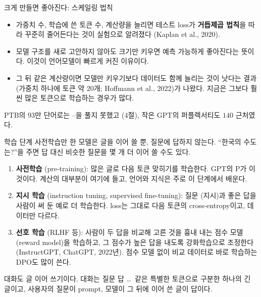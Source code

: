 \documentclass[aspectratio=169,11pt]{beamer}
\begin{document}
\begin{frame}{크게 만들면 좋아진다: 스케일링 법칙}
\begin{itemize}
\item 가중치 수, 학습에 쓴 토큰 수, 계산량을 늘리면 테스트 loss가 \textbf{거듭제곱 법칙}을 따라
  꾸준히 줄어든다는 것이 실험으로 알려졌다 (Kaplan et al., 2020).
\item 모델 구조를 새로 고안하지 않아도 크기만 키우면 예측 가능하게 좋아진다는 뜻이다.
  이것이 언어모델이 빠르게 커진 이유이다.
\item 그 뒤 같은 계산량이면 모델만 키우기보다 데이터도 함께 늘리는 것이 낫다는 결과
  (가중치 하나에 토큰 약 $20$개; Hoffmann et al., 2022)가 나왔다.
  지금은 그보다 훨씬 많은 토큰으로 학습하는 경우가 많다.
\end{itemize}
\vskip2mm
\begin{remarkbox}
PTB의 $93$만 단어로는 --을 풀지 못했고 (4절),
작은 GPT의 퍼플렉서티도 $140$ 근처였다.
\end{remarkbox}
\end{frame}

\begin{frame}{학습 단계}
\small
사전학습만 한 모델은 글을 이어 쓸 뿐, 질문에 답하지 않는다.
``한국의 수도는?''을 주면 답 대신 비슷한 질문을 몇 개 더 이어 쓸 수도 있다.
\begin{enumerate}
\item \textbf{사전학습} (pre-training): 많은 글로 다음 토큰 맞히기를 학습한다. GPT의 P가 이것이다.
  계산의 대부분이 여기에 들고, 언어와 지식은 주로 이 단계에서 배운다.
\item \textbf{지시 학습} (instruction tuning, supervised fine-tuning):
  질문 (지시)과 좋은 답을 사람이 써 둔 예로 더 학습한다.
  loss는 그대로 다음 토큰의 cross-entropy이고, 데이터만 다르다.
\item \textbf{선호 학습} (RLHF 등): 사람이 두 답을 비교해 고른 것을 흉내 내는
  점수 모델 (reward model)을 학습하고, 그 점수가 높은 답을 내도록 강화학습으로 조정한다
  (InstructGPT, ChatGPT, 2022년). 점수 모델 없이 비교 데이터로 바로 학습하는 DPO도 많이 쓴다.
\end{enumerate}
\vskip1mm
\begin{keybox}
대화도 글 이어 쓰기이다. 대화는  질문  답 \dots\ 같은 특별한 토큰으로
구분한 하나의 긴 글이고, 사용자의 질문이 prompt, 모델이 그 뒤에 이어 쓴 글이 답이다.
\end{keybox}
\end{frame}
\end{document}
